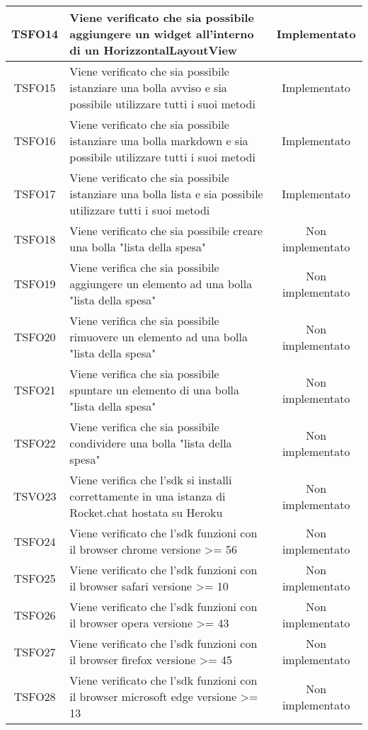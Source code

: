\begin{center}
\begin{longtable}{|c|>{\centering}m{10cm}|c|}
		TSFO14 & Viene verificato che sia possibile aggiungere un widget all'interno di un HorizzontalLayoutView & Implementato \\ \hline
		TSFO15 & Viene verificato che sia possibile istanziare una bolla avviso e sia possibile utilizzare tutti i suoi metodi & Implementato \\ \hline
		TSFO16 & Viene verificato che sia possibile istanziare una bolla markdown e sia possibile utilizzare tutti i suoi metodi & Implementato \\ \hline
		TSFO17 & Viene verificato che sia possibile istanziare una bolla lista e sia possibile utilizzare tutti i suoi metodi & Implementato \\ \hline
		TSFO18 & Viene verificato che sia possibile creare una bolla "lista della spesa" & Non implementato \\ \hline
		TSFO19 & Viene verifica che sia possibile aggiungere un elemento ad una bolla "lista della spesa" & Non implementato \\ \hline
		TSFO20 & Viene verifica che sia possibile rimuovere un elemento ad una bolla "lista della spesa" & Non implementato \\ \hline
		TSFO21 & Viene verifica che sia possibile spuntare un elemento di una bolla "lista della spesa" & Non implementato \\ \hline
		TSFO22 & Viene verifica che sia possibile condividere una bolla "lista della spesa" & Non implementato \\ \hline
		TSVO23 & Viene verifica che l'sdk si installi correttamente in una istanza di Rocket.chat hostata su Heroku & Non implementato \\ \hline
		TSFO24 & Viene verificato che l'sdk funzioni con il browser chrome versione >= 56 & Non implementato \\ \hline
		TSFO25 & Viene verificato che l'sdk funzioni con il browser safari versione >= 10 & Non implementato \\ \hline
		TSFO26 & Viene verificato che l'sdk funzioni con il browser opera versione >= 43 & Non implementato \\ \hline
		TSFO27 & Viene verificato che l'sdk funzioni con il browser firefox versione >= 45 & Non implementato \\ \hline
		TSFO28 & Viene verificato che l'sdk funzioni con il browser microsoft edge versione >= 13 & Non implementato \\ \hline
	\end{longtable}
\end{center}
